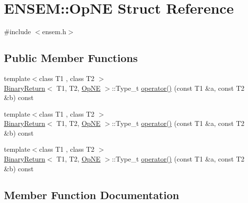 \hypertarget{structENSEM_1_1OpNE}{}\section{E\+N\+S\+EM\+:\+:Op\+NE Struct Reference}
\label{structENSEM_1_1OpNE}


{\ttfamily \#include $<$ensem.\+h$>$}

\subsection*{Public Member Functions}
\begin{DoxyCompactItemize}
\item 
{\footnotesize template$<$class T1 , class T2 $>$ }\\\mbox{\hyperlink{structENSEM_1_1BinaryReturn}{Binary\+Return}}$<$ T1, T2, \mbox{\hyperlink{structENSEM_1_1OpNE}{Op\+NE}} $>$\+::Type\+\_\+t \mbox{\hyperlink{structENSEM_1_1OpNE_a7591dc1f0aa2c67130ef3ec7a406f54e}{operator()}} (const T1 \&a, const T2 \&b) const
\item 
{\footnotesize template$<$class T1 , class T2 $>$ }\\\mbox{\hyperlink{structENSEM_1_1BinaryReturn}{Binary\+Return}}$<$ T1, T2, \mbox{\hyperlink{structENSEM_1_1OpNE}{Op\+NE}} $>$\+::Type\+\_\+t \mbox{\hyperlink{structENSEM_1_1OpNE_a7591dc1f0aa2c67130ef3ec7a406f54e}{operator()}} (const T1 \&a, const T2 \&b) const
\item 
{\footnotesize template$<$class T1 , class T2 $>$ }\\\mbox{\hyperlink{structENSEM_1_1BinaryReturn}{Binary\+Return}}$<$ T1, T2, \mbox{\hyperlink{structENSEM_1_1OpNE}{Op\+NE}} $>$\+::Type\+\_\+t \mbox{\hyperlink{structENSEM_1_1OpNE_a7591dc1f0aa2c67130ef3ec7a406f54e}{operator()}} (const T1 \&a, const T2 \&b) const
\end{DoxyCompactItemize}


\subsection{Member Function Documentation}
\mbox{\label{structENSEM_1_1OpNE_a7591dc1f0aa2c67130ef3ec7a406f54e}} 
